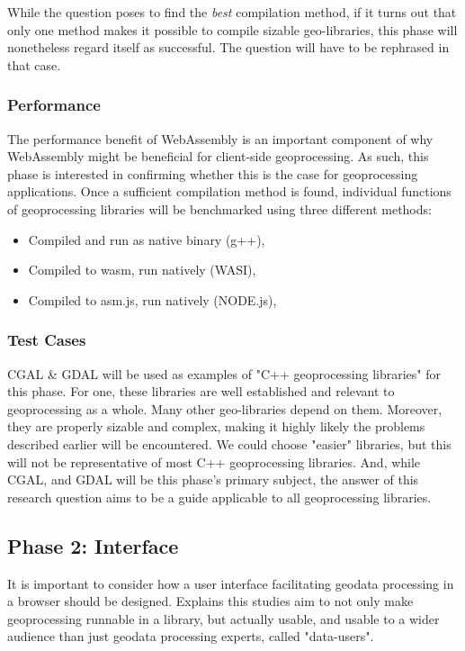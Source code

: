 While the question poses to find the \textit{best} compilation method, if it turns out that only one method makes it possible to compile sizable geo-libraries, this phase will nonetheless regard itself as successful. The question will have to be rephrased in that case. 

\subsubsection*{Performance}
The performance benefit of WebAssembly is an important component of why WebAssembly might be beneficial for client-side geoprocessing. As such, this phase is interested in confirming whether this is the case for geoprocessing applications. Once a sufficient compilation method is found, individual functions of geoprocessing libraries will be benchmarked using three different methods: 

\begin{itemize}
    \item Compiled and run as native binary (g++), 
    \item Compiled to wasm, run natively (WASI),
    \item Compiled to asm.js, run natively (NODE.js),
\end{itemize}

\subsubsection*{Test Cases}
CGAL \& GDAL will be used as examples of "C++ geoprocessing libraries" for this phase. For one, these libraries are well established and relevant to geoprocessing as a whole. Many other geo-libraries depend on them. Moreover, they are properly sizable and complex, making it highly likely the problems described earlier will be encountered. We could choose "easier" libraries, but this will not be representative of most C++ geoprocessing libraries. And, while CGAL, and GDAL will be this phase's primary subject, the answer of this research question aims to be a guide applicable to all geoprocessing libraries. 


\subsection{Phase 2: Interface}

It is important to consider how a user interface facilitating geodata processing in a browser should be designed.  Explains this studies aim to not only make geoprocessing runnable in a library, but actually usable, and usable to a wider audience than just geodata processing experts, called "data-users". 

